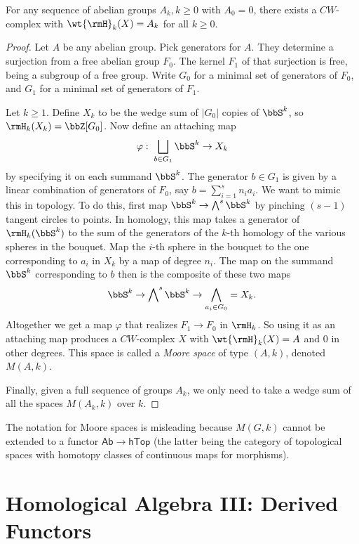 \begin{prop}
    For any sequence of abelian groups $A_k,k\geq 0$ with $A_0=0$, there exists a $CW$-complex with $\wt{\rmH}_k(X)=A_k$ for all $k\geq 0$.
\end{prop}
\begin{proof}
    Let $A$ be any abelian group. Pick generators for $A$. They determine a surjection from a free abelian group $F_0$. The kernel $F_1$ of that surjection is free, being a subgroup of a free group. Write $G_0$ for a minimal set of generators of $F_0$, and $G_1$ for a minimal set of generators of $F_1$.

    Let $k\geq 1$. Define $X_k$ to be the wedge sum of $|G_0|$ copies of $\bbS^k$, so $\rmH_k(X_k)=\bbZ[G_0]$. Now define an attaching map
    \[\varphi:\;\bigsqcup_{b\in G_1}\bbS^k\to X_k\]
    by specifying it on each summand $\bbS^k$. The generator $b\in G_1$ is given by a linear combination of generators of $F_0$, say $b=\sum_{i=1}^s n_i a_i$. We want to mimic this in topology. To do this, first map $\bbS^k\to \bigwedge\nolimits^s \bbS^k$ by pinching $(s-1)$ tangent circles to points. In homology, this map takes a generator of $\rmH_k(\bbS^k)$ to the sum of the generators of the $k$-th homology of the various spheres in the bouquet. Map the $i$-th sphere in the bouquet to the one corresponding to $a_i$ in $X_k$ by a map of degree $n_i$. The map on the summand $\bbS^k$ corresponding to $b$ then is the composite of these two maps
    \[\bbS^k\to \bigwedge\nolimits^s \bbS^k\to \bigwedge_{a_i\in G_0}=X_k.\]
    Altogether we get a map $\varphi$ that realizes $F_1\to F_0$ in $\rmH_k$. So using it as an attaching map produces a $CW$-complex $X$ with $\wt{\rmH}_k(X)=A$ and $0$ in other degrees. This space is called a \emph{Moore space} of type $(A,k)$, denoted $M(A,k)$.

    Finally, given a full sequence of groups $A_k$, we only need to take a wedge sum of all the spaces $M(A_k,k)$ over $k$.
\end{proof}

\begin{rem}
    The notation for Moore spaces is misleading because $M(G,k)$ cannot be extended to a functor $\mathsf{Ab}\to \mathsf{hTop}$ (the latter being the category of topological spaces with homotopy classes of continuous maps for morphisms).
\end{rem}




\clearpage
\chapter{Homological Algebra III: Derived Functors}

